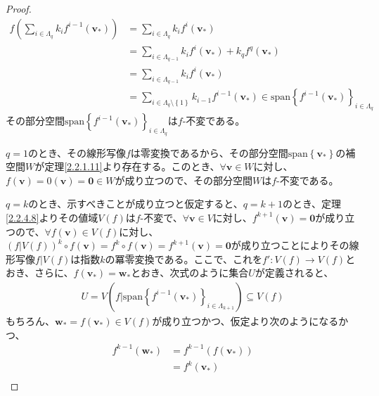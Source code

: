 \documentclass[dvipdfmx]{jsarticle}
\begin{document}
\begin{proof}
\begin{align*}
f\left( \sum_{i \in \varLambda_{q}} {k_{i}f^{i - 1}\left( \mathbf{v}_{*} \right)} \right) &= \sum_{i \in \varLambda_{q}} {k_{i}f^{i}\left( \mathbf{v}_{*} \right)}\\
&= \sum_{i \in \varLambda_{q - 1}} {k_{i}f^{i}\left( \mathbf{v}_{*} \right)} + k_{q}f^{q}\left( \mathbf{v}_{*} \right)\\
&= \sum_{i \in \varLambda_{q - 1}} {k_{i}f^{i}\left( \mathbf{v}_{*} \right)}\\
&= \sum_{i \in \varLambda_{q} \setminus \left\{ 1 \right\}} {k_{i - 1}f^{i - 1}\left( \mathbf{v}_{*} \right)} \in {\mathrm{span}}\left\{ f^{i - 1}\left( \mathbf{v}_{*} \right) \right\}_{i \in \varLambda_{q}}
\end{align*}
その部分空間${\mathrm{span}}\left\{ f^{i - 1}\left( \mathbf{v}_{*} \right) \right\}_{i \in \varLambda_{q}}$は$f$-不変である。\par
$q = 1$のとき、その線形写像$f$は零変換であるから、その部分空間${\mathrm{span}}\left\{ \mathbf{v}_{*} \right\}$の補空間$W$が定理\ref{2.2.1.11}より存在する。このとき、$\forall\mathbf{v} \in W$に対し、$f\left( \mathbf{v} \right) = 0\left( \mathbf{v} \right) = \mathbf{0} \in W$が成り立つので、その部分空間$W$は$f$-不変である。\par
$q = k$のとき、示すべきことが成り立つと仮定すると、$q = k + 1$のとき、定理\ref{2.2.4.8}よりその値域$V(f)$は$f$-不変で、$\forall\mathbf{v} \in V$に対し、$f^{k + 1}\left( \mathbf{v} \right) = \mathbf{0}$が成り立つので、$\forall f\left( \mathbf{v} \right) \in V(f)$に対し、$\left( f|V(f) \right)^{k} \circ f\left( \mathbf{v} \right) = f^{k} \circ f\left( \mathbf{v} \right) = f^{k + 1}\left( \mathbf{v} \right) = \mathbf{0}$が成り立つことによりその線形写像$f|V(f)$は指数$k$の冪零変換である。ここで、これを$f':V(f) \rightarrow V(f)$とおき、さらに、$f\left( \mathbf{v}_{*} \right) = \mathbf{w}_{*}$とおき、次式のように集合$U$が定義されると、
\begin{align*}
U = V\left( f|{\mathrm{span}}\left\{ f^{i - 1}\left( \mathbf{v}_{*} \right) \right\}_{i \in \varLambda_{k + 1}} \right) \subseteq V(f)
\end{align*}
もちろん、$\mathbf{w}_{*} = f\left( \mathbf{v}_{*} \right) \in V(f)$が成り立つかつ、仮定より次のようになるかつ、
\begin{align*}
f^{k - 1}\left( \mathbf{w}_{*} \right) &= f^{k - 1}\left( f\left( \mathbf{v}_{*} \right) \right)\\
&= f^{k}\left( \mathbf{v}_{*} \right)\\

\end{align*}
\end{proof}
\end{document}
